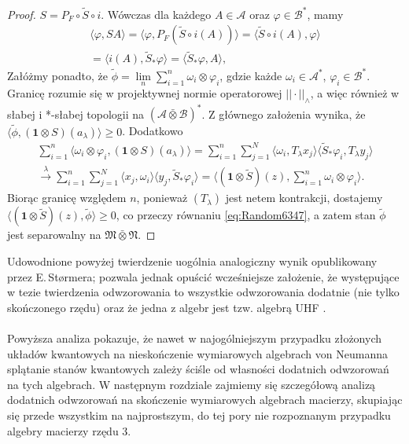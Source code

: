 \begin{proof}
$S = P_{F} \circ \tilde{S} \circ i$.
Wówczas dla każdego $A \in \mathcal{A}$ oraz $\varphi \in \mathcal{B}^{*}$,
mamy
\begin{eqnarray}
\langle \varphi, SA \rangle =
\langle \varphi, P_{F} ( \tilde{S} \circ i (A)) \rangle =
\langle  \tilde{S} \circ i (A), \varphi \rangle \nonumber\\
=\langle i(A), \tilde{S}_{*} \varphi \rangle =
\langle \tilde{S}_{*} \varphi, A \rangle,
\end{eqnarray}
Załóżmy ponadto, że
$\tilde{\phi} = \lim \limits_{n} \sum_{i=1}^{n}\omega_{i} \otimes \varphi_{i}$,
gdzie każde $\omega_{i} \in \mathcal{A}^{*}$,
$\varphi_{i} \in \mathcal{B}^{*}$.
Granicę rozumie się w projektywnej normie operatorowej $|| \cdot ||_{\wedge}$,
a więc również w słabej i *-słabej topologii na
$(\mathcal{A} \bar{\otimes} \mathcal{B})^{*}$.
Z głównego założenia wynika, że
$\langle \tilde{\phi},(\mathbf{1} \otimes S) (a_{\lambda}) \rangle \geq 0$. Dodatkowo
\begin{eqnarray}
\sum \limits_{i=1}^{n}\langle \omega_{i} \otimes \varphi_{i},
(\mathbf{1} \otimes S)(a_{\lambda}) \rangle =
\sum \limits_{i=1}^{n} \sum \limits_{j=1}^{N}
\langle \omega_{i} , T_{\lambda} x_{j} \rangle
\langle \tilde{S}_{*} \varphi_{i}, T_{\lambda} y_{j}\rangle \nonumber\\
\stackrel{\lambda}{\longrightarrow}\sum \limits_{i=1}^{n} \sum \limits_{j=1}^{N}
\langle  x_{j}, \omega_{i} \rangle\langle  y_{j},  \tilde{S}_{*} \varphi_{i} \rangle =
\langle (\mathbf{1} \otimes \tilde{S})(z),
\sum \limits_{i=1}^{n} \omega_{i} \otimes \varphi_{i} \rangle .
\end{eqnarray}
Biorąc granicę względem $n$,
ponieważ $(T_{\lambda})$ jest netem kontrakcji, dostajemy
$\langle (\mathbf{1} \otimes \tilde{S}) (z) ,
\tilde{\phi}\rangle \geq 0$,
co przeczy równaniu \eqref{eq:Random6347},
a zatem stan $\tilde{\phi}$ jest separowalny na
$\mathfrak{M} \bar{\otimes} \mathfrak{N}$.
\end{proof}

Udowodnione powyżej twierdzenie uogólnia analogiczny wynik opublikowany przez
E.\,St{\o}rmera; pozwala jednak opuścić wcześniejsze założenie, że występujące
w tezie twierdzenia odwzorowania to wszystkie odwzorowania dodatnie
(nie tylko skończonego rzędu) oraz że jedna z algebr jest tzw. algebrą
UHF \cite{stormer2009separable}.

\paragraph{}
Powyższa analiza pokazuje, że nawet w najogólniejszym przypadku złożonych
układów kwantowych na nieskończenie wymiarowych algebrach von Neumanna
splątanie stanów kwantowych zależy ściśle od własności dodatnich odwzorowań
na tych algebrach.
W następnym rozdziale zajmiemy się szczegółową analizą dodatnich odwzorowań
na skończenie wymiarowych algebrach macierzy, skupiając się przede wszystkim
na najprostszym, do tej pory nie rozpoznanym przypadku algebry macierzy
rzędu 3.
